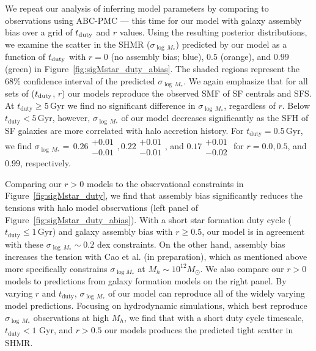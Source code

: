 \documentclass[12pt, letterpaper, preprint, tighten]{aastex62}
\newcommand{\edt}[1]{{\color{dred}{\bf} #1}}
\newcommand{\siglogm}{\sigma_{\log M_*}}
\begin{document}
We repeat our analysis of inferring model parameters by comparing to observations
using ABC-PMC --- this time for our model with galaxy assembly bias over a grid of
$t_{\rm duty}$ and $r$ values. Using the resulting posterior distributions, we
examine the scatter in the SHMR ($\sigma_{\log\,M_*}$) predicted by our model as a
function of $t_{\rm duty}$ with $r=0$ (no assembly bias; blue), $0.5$ (orange),
and $0.99$ (green) in Figure~\ref{fig:sigMstar_duty_abias}. The shaded regions
represent the $68\%$ confidence interval of the predicted $\sigma_{\log\,M_*}$.
We again emphasize that for all sets of ($t_{\rm duty}$, $r$) our models reproduce
the observed SMF of SF centrals and SFS.  At $t_\mathrm{duty} \geq 5\,\mathrm{Gyr}$
we find no significant difference in $\sigma_{\log\,M_*}$, regardless of $r$.
Below $t_\mathrm{duty} < 5\,\mathrm{Gyr}$, however, $\sigma_{\log\,M_*}$ of our
model decreases significantly as the SFH of SF galaxies are more correlated
with halo accretion history.  For $t_\mathrm{duty} = 0.5\,\mathrm{Gyr}$, we find
$\sigma_{\log\,M_*}{=}\,0.26\substack{+0.01\\-0.01},
0.22\substack{+0.01\\-0.01}$, and $0.17\substack{+0.01\\-0.02} $
for $r = 0.0, 0.5$, and $0.99$, respectively.

\edt{Comparing our $r > 0$ models to the observational constraints in
Figure~\ref{fig:sigMstar_duty}, we find that assembly bias significantly
reduces the tensions with halo model observations (left panel of
Figure~\ref{fig:sigMstar_duty_abias})}.
With a short star formation duty cycle ($t_\mathrm{duty} \leq 1\,\mathrm{Gyr}$)
and galaxy assembly bias with $r \ge 0.5$, our model is in agreement with
these $\sigma_{\log\,M_*} \sim 0.2$ dex constraints. On the other hand,
assembly bias increases the tension with
\edt{Cao et al. (in preparation), which as mentioned above more specifically 
constrains $\siglogm$ at $M_h\sim 10^{12}M_\odot$. We also compare our $r > 0$ models to
predictions from galaxy formation models on the right panel.}
By varying $r$ and $t_\mathrm{duty}$, $\sigma_{\log\,M_*}$ of our model
can reproduce all of the widely varying model predictions.
\edt{Focusing on hydrodynamic simulations, which best reproduce $\sigma_{\log\,M_*}$
observations at high $M_h$, we find that with a short duty cycle timescale,
$t_\mathrm{duty} < 1$ Gyr, and $r > 0.5$ our models produces the predicted tight
scatter in SHMR.}
\end{document}
